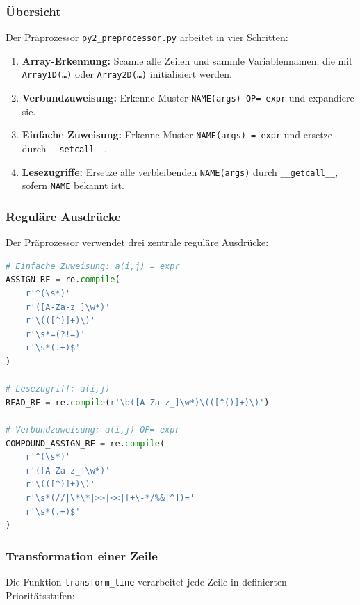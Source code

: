 ﻿\documentclass[a4paper,12pt]{article}
\theoremstyle{definition}
\begin{document}
\subsubsection{\"Ubersicht}

Der Pr\"aprozessor \texttt{py2\_preprocessor.py} arbeitet in vier Schritten:

\begin{enumerate}
	\item \textbf{Array-Erkennung:} Scanne alle Zeilen und sammle Variablennamen,
	      die mit \texttt{Array\newline 1D(\ldots)} oder \texttt{Array2D(\ldots)} initialisiert werden.
	\item \textbf{Verbundzuweisung:} Erkenne Muster \texttt{NAME(args) OP= expr}
	      und expandiere sie.
	\item \textbf{Einfache Zuweisung:} Erkenne Muster \texttt{NAME(args) = expr}
	      und ersetze durch \texttt{\_\_setcall\_\_}.
	\item \textbf{Lesezugriffe:} Ersetze alle verbleibenden \texttt{NAME(args)}
	      durch \texttt{\_\_getcall\_\_}, sofern \texttt{NAME} bekannt ist.
\end{enumerate}

\subsubsection{Regul\"are Ausdr\"ucke}

Der Pr\"aprozessor verwendet drei zentrale regul\"are Ausdr\"ucke:

\begin{lstlisting}[language=Python, caption={Regul\"are Ausdr\"ucke des Pr\"aprozessors}]
# Einfache Zuweisung: a(i,j) = expr
ASSIGN_RE = re.compile(
    r'^(\s*)'
    r'([A-Za-z_]\w*)'
    r'\(([^)]+)\)'
    r'\s*=(?!=)'
    r'\s*(.+)$'
)

# Lesezugriff: a(i,j)
READ_RE = re.compile(r'\b([A-Za-z_]\w*)\(([^()]+)\)')

# Verbundzuweisung: a(i,j) OP= expr
COMPOUND_ASSIGN_RE = re.compile(
    r'^(\s*)'
    r'([A-Za-z_]\w*)'
    r'\(([^)]+)\)'
    r'\s*(//|\*\*|>>|<<|[+\-*/%&|^])='
    r'\s*(.+)$'
)
\end{lstlisting}

\subsubsection{Transformation einer Zeile}

Die Funktion \texttt{transform\_line} verarbeitet jede Zeile in definierten
Priorit\"atsstufen:
\end{document}
